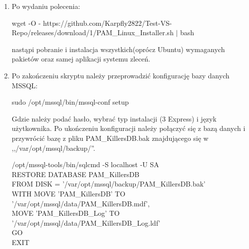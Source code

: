 \documentclass[12pt,a4paper]{article}
\begin{document}
			\begin{enumerate}
				\item Po wydaniu polecenia:
					\begin{tcolorbox}[minipage,colback=white,arc=0pt,outer arc=0pt, fontupper=\scriptsize]
						wget -O - https://github.com/Karpfly2822/Test-VS-Repo/releases/download/1/PAM\_Linux\_Installer.sh $|$ bash
					\end{tcolorbox}			
					nastąpi pobranie i instalacja wszystkich(oprócz Ubuntu) wymaganych pakietów oraz samej aplikacji systemu zleceń.
			
				\item Po zakończeniu skryptu należy przeprowadzić konfigurację bazy danych MSSQL:
					\begin{tcolorbox}[minipage,colback=white,arc=0pt,outer arc=0pt, fontupper=\footnotesize]			
						sudo /opt/mssql/bin/mssql-conf setup
					\end{tcolorbox}
					Gdzie należy podać hasło, wybrać typ instalacji (3 Express) i język użytkownika. Po ukończeniu konfiguracji należy połączyć się z bazą danych i przywrócić bazę z pliku
					PAM\_KillersDB.bak znajdującego się w ,,/var/opt/mssql/backup/''.	
					\begin{tcolorbox}[minipage,colback=white,arc=0pt,outer arc=0pt, fontupper=\footnotesize]			
						/opt/mssql-tools/bin/sqlcmd -S localhost -U SA \\
						RESTORE DATABASE PAM\_KillersDB	\\
						FROM DISK = '/var/opt/mssql/backup/PAM\_KillersDB.bak'	\\
						WITH MOVE 'PAM\_KillersDB' TO '/var/opt/mssql/data/PAM\_KillersDB.mdf',	\\
						MOVE 'PAM\_KillersDB\_Log' TO '/var/opt/mssql/data/PAM\_KillersDB\_Log.ldf'	\\
						GO \\
						EXIT
					\end{tcolorbox}				
			

\end{enumerate}
\end{document}
